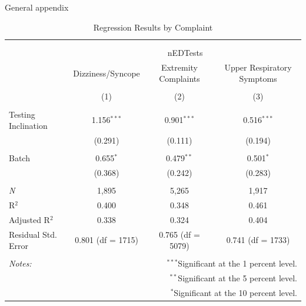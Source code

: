 \documentclass[,,nonblindrev]{informs}
\begin{document}
\begin{APPENDIX}{General appendix}
\begin{table}[!htbp] \centering 
  \caption{Regression Results by Complaint} 
  \label{} 
\begin{tabular}{@{\extracolsep{5pt}}lccc} 
\\[-1.8ex]\hline 
\hline \\[-1.8ex] 
\\[-1.8ex] & \multicolumn{3}{c}{nEDTests} \\ 
 & Dizziness/Syncope & Extremity Complaints & Upper Respiratory Symptoms \\ 
\\[-1.8ex] & (1) & (2) & (3)\\ 
\hline \\[-1.8ex] 
 Testing Inclination & 1.156$^{***}$ & 0.901$^{***}$ & 0.516$^{***}$ \\ 
  & (0.291) & (0.111) & (0.194) \\ 
  & & & \\ 
 Batch & 0.655$^{*}$ & 0.479$^{**}$ & 0.501$^{*}$ \\ 
  & (0.368) & (0.242) & (0.283) \\ 
  & & & \\ 
\textit{N} & 1,895 & 5,265 & 1,917 \\ 
R$^{2}$ & 0.400 & 0.348 & 0.461 \\ 
Adjusted R$^{2}$ & 0.338 & 0.324 & 0.404 \\ 
Residual Std. Error & 0.801 (df = 1715) & 0.765 (df = 5079) & 0.741 (df = 1733) \\ 
\hline 
\hline \\[-1.8ex] 
\textit{Notes:} & \multicolumn{3}{r}{$^{***}$Significant at the 1 percent level.} \\ 
 & \multicolumn{3}{r}{$^{**}$Significant at the 5 percent level.} \\ 
 & \multicolumn{3}{r}{$^{*}$Significant at the 10 percent level.} \\ 
\end{tabular} 
\end{table}


\end{APPENDIX}
\end{document}
